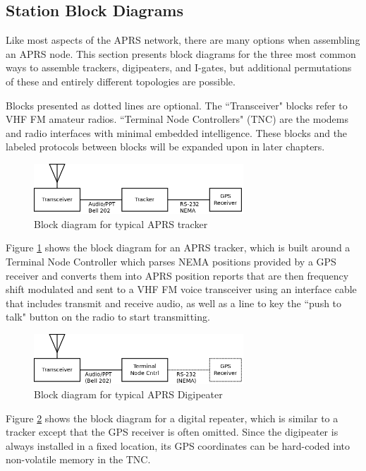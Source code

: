 \subsection{Station Block Diagrams}

Like most aspects of the APRS network, there are many options 
when assembling an APRS node.
This section presents block diagrams for the three most common ways
to assemble trackers, digipeaters, and I-gates, but additional permutations
of these and entirely different topologies are possible.

Blocks presented as dotted lines are optional. The ``Transceiver" blocks refer to 
VHF FM amateur radios. ``Terminal Node Controllers" (TNC) are the modems and radio
interfaces with minimal embedded intelligence. These blocks and the labeled protocols
between blocks will be expanded upon in later chapters.

\begin{figure}
	\centering
	\includegraphics[width=0.7\textwidth]{src/dia/tracker}
	\caption{Block diagram for typical APRS tracker}
	\label{fig:blocktracker}
\end{figure}

Figure \ref{fig:blocktracker} shows the block diagram for an APRS tracker, 
which is built around a Terminal Node Controller which parses NEMA positions
provided by a GPS receiver and converts them into APRS position reports that
are then frequency shift modulated and sent to a VHF FM voice transceiver using an
interface cable that includes transmit and receive audio, as well as a line to
key the ``push to talk" button on the radio to start transmitting.

\begin{figure}
	\centering
	\includegraphics[width=0.7\textwidth]{src/dia/tnc_digi}
	\caption{Block diagram for typical APRS Digipeater}
	\label{fig:blockdigi}
\end{figure}

Figure \ref{fig:blockdigi} shows the block diagram for a digital repeater, which
is similar to a tracker except that the GPS receiver is often omitted. 
Since the digipeater is always installed in a fixed location, its GPS coordinates
can be hard-coded into non-volatile memory in the TNC.


